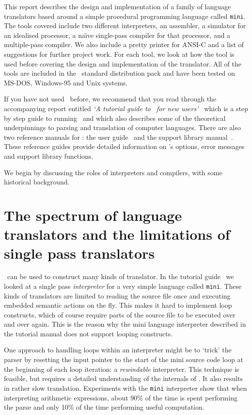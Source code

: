 This report describes the design and implementation of a family of
language translators based around a simple procedural programming
language called {\tt mini}. The tools covered include two different
interpreters, an assembler, a simulator  for an idealised processor, a
na\"\i ve single-pass compiler for that processor, and a multiple-pass
compiler. We also include a pretty printer for ANSI-C and a list of suggestions
for further project work. For each tool, we look at how
the tool is used before covering the design and implementation of the
translator. All of the tools are included in the \rdp\ standard
distribution pack and have been tested on MS-DOS, Windows-95 and Unix
systems.

If you have not used \rdp\ before, we recommend that you read through
the accompanying report entitled {\em `A tutorial guide to \rdp\ for new
users'}~\cite{rdp:tut:1.5} which is a step by step guide to running
\rdp\ and which also describes some of the theoretical underpinnings to
parsing and translation of computer languages. There are also two
reference manuals for \rdp: the user guide~\cite{rdp:user:1.5} and the
support library manual~\cite{rdp:supp:1.5}. These reference guides
provide detailed information on \rdp's options, error messages and
support library functions. 

We begin by discussing the roles of interpreters and compilers,
with some historical background.

\section{The spectrum of language translators and the limitations of
single pass translators}

\rdp\ can be used to construct many kinds of translator. In the tutorial
guide~\cite{rdp:tut:1.5} we looked at a single pass {\em interpreter}
for a very simple language called {\tt mini}. These kinds of translators
are limited to reading the source file once and executing embedded
semantic actions on the fly. This makes it hard to implement loop
constructs, which of course require parts of the source file to be
executed over and over again. This is the reason why the mini language
interpreter described in the tutorial manual does not support looping
constructs.

One approach to handling loops within an interpreter might be to `trick'
the parser by resetting the input pointer to the start of the mini source code loop at
the beginning of each loop iteration: a {\em rewindable} interpreter. This
technique is feasible, but requires a detailed understanding of the
internals of \rdp. It also results in rather slow translation.
Experiments with the {\tt mini} interpreter show
that when interpreting arithmetic expressions, about 90\% of the time is
spent performing the parse and only 10\% of the time performing  useful
computation. 


